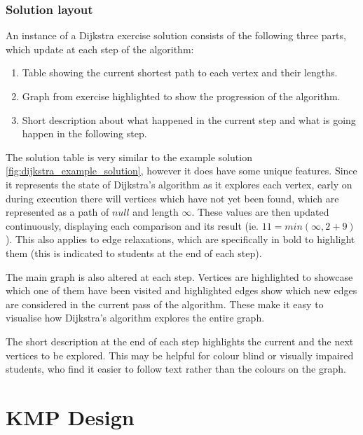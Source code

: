 \documentclass{l4proj}
\begin{document}
\subsection{Solution layout}

An instance of a Dijkstra exercise solution consists of the following three parts, which update at each step of the algorithm:

\begin{enumerate}
	\item
	Table showing the current shortest path to each vertex and their lengths.
	\item
	Graph from exercise highlighted to show the progression of the algorithm.
	\item
	Short description about what happened in the current step and what is going happen in the following step.
\end{enumerate}

The solution table is very similar to the example solution  \autoref{fig:dijkstra_example_solution}, however it does have some unique features. Since it represents the state of Dijkstra's algorithm as it explores each vertex, early on during execution there will vertices which have not yet been found, which are represented as a path of $null$ and length $\infty$. These values are then updated continuously, displaying each comparison and its result (ie. $11 = min(\infty, 2+9)$). This also applies to edge relaxations, which are specifically in bold to highlight them (this is indicated to students at the end of each step).

The main graph is also altered at each step. Vertices are highlighted to showcase which one of them have been visited and highlighted edges show which new edges are considered in the current pass of the algorithm. These make it easy to visualise how Dijkstra's algorithm explores the entire graph.

The short description at the end of each step highlights the current and the next vertices to be explored. This may be helpful for colour blind or visually impaired students, who find it easier to follow text rather than the colours on the graph.


\chapter{KMP Design}
\end{document}
